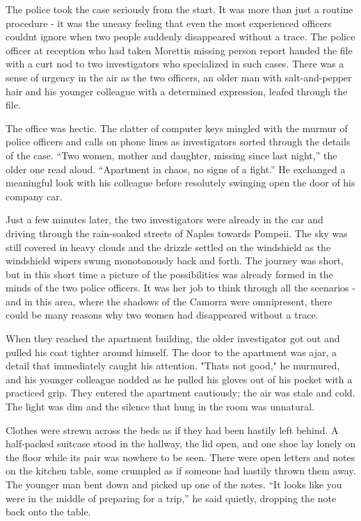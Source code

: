 \documentclass[
]{article}
\begin{document}
The police took the case seriously from the start. It was more than just
a routine procedure - it was the uneasy feeling that even the most
experienced officers couldn\textquotesingle t ignore when two people
suddenly disappeared without a trace. The police officer at reception
who had taken Moretti\textquotesingle s missing person report handed the
file with a curt nod to two investigators who specialized in such cases.
There was a sense of urgency in the air as the two officers, an older
man with salt-and-pepper hair and his younger colleague with a
determined expression, leafed through the file.

The office was hectic. The clatter of computer keys mingled with the
murmur of police officers and calls on phone lines as investigators
sorted through the details of the case. ``Two women, mother and
daughter, missing since last night,'' the older one read aloud.
``Apartment in chaos, no signs of a fight.'' He exchanged a meaningful
look with his colleague before resolutely swinging open the door of his
company car.

Just a few minutes later, the two investigators were already in the car
and driving through the rain-soaked streets of Naples towards Pompeii.
The sky was still covered in heavy clouds and the drizzle settled on the
windshield as the windshield wipers swung monotonously back and forth.
The journey was short, but in this short time a picture of the
possibilities was already formed in the minds of the two police
officers. It was her job to think through all the scenarios - and in
this area, where the shadows of the Camorra were omnipresent, there
could be many reasons why two women had disappeared without a trace.

When they reached the apartment building, the older investigator got out
and pulled his coat tighter around himself. The door to the apartment
was ajar, a detail that immediately caught his attention.
"That\textquotesingle s not good," he murmured, and his younger
colleague nodded as he pulled his gloves out of his pocket with a
practiced grip. They entered the apartment cautiously; the air was stale
and cold. The light was dim and the silence that hung in the room was
unnatural.

Clothes were strewn across the beds as if they had been hastily left
behind. A half-packed suitcase stood in the hallway, the lid open, and
one shoe lay lonely on the floor while its pair was nowhere to be seen.
There were open letters and notes on the kitchen table, some crumpled as
if someone had hastily thrown them away. The younger man bent down and
picked up one of the notes. ``It looks like you were in the middle of
preparing for a trip,'' he said quietly, dropping the note back onto the
table.
\end{document}
